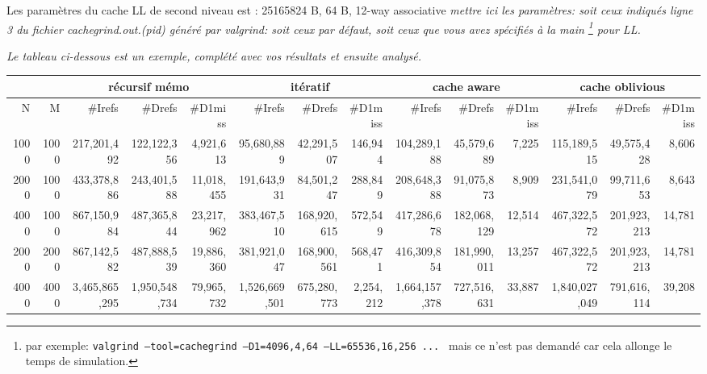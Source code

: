 \documentclass[10pt,a4paper]{article}
\begin{document}
Les paramètres du cache LL de second niveau est : 25165824 B, 64 B, 12-way associative
{\em mettre ici les paramètres: soit ceux indiqués ligne 3
du fichier cachegrind.out.(pid) généré par valgrind: soit ceux par défaut,
soit ceux que vous avez spécifiés à la main
\footnote{par exemple:
{\tt valgrind --tool=cachegrind --D1=4096,4,64 --LL=65536,16,256  ... }
mais ce n'est pas demandé car cela allonge le temps de simulation. } 
 pour LL. }

{\em Le tableau ci-dessous est un exemple,  complété avec vos résultats et 
ensuite analysé.}
\\

{\footnotesize
\begin{tabular}{|r|r||r|r|r||r|r|r||r|r|r||r|r|r||}
\hline
 \multicolumn{2}{|c||}{ } 
& \multicolumn{3}{c||}{récursif mémo}
& \multicolumn{3}{c||}{itératif}
& \multicolumn{3}{c||}{cache aware}
& \multicolumn{3}{c||}{cache oblivious}
\\ \hline
N & M 
& \#Irefs & \#Drefs & \#D1miss %
& \#Irefs & \#Drefs & \#D1miss %
& \#Irefs & \#Drefs & \#D1miss %
& \#Irefs & \#Drefs & \#D1miss %
\\ \hline
\hline
1000 & 1000 
& 217,201,492 & 122,122,356 & 4,921,613  %
& 95,680,889 & 42,291,507 &  146,944 %
& 104,289,188 & 45,579,689 & 7,225  %
& 115,189,515 & 49,575,428 &  8,606  %
\\ \hline
2000 & 1000 
& 433,378,886 & 243,401,588 & 11,018,455  %
& 191,643,931 & 84,501,247 & 288,849   %
& 208,648,388 & 91,075,873 &  8,909 %
& 231,541,079 & 99,711,653 & 8,643  %
\\ \hline
4000 & 1000 
&867,150,984 & 487,365,844 & 23,217,962  %
&383,467,510  & 168,920,615 & 572,549  %
& 417,286,678 & 182,068,129 & 12,514  %
& 467,322,572 & 201,923,213 &  14,781 %
\\ \hline
2000 & 2000 
& 867,142,582 & 487,888,539 &  19,886,360 %
& 381,921,047 & 168,900,561 & 568,471  %
& 416,309,854 & 181,990,011 & 13,257  %
& 467,322,572 & 201,923,213 &  14,781 %
\\ \hline
4000 & 4000 
& 3,465,865,295 & 1,950,548,734 & 79,965,732  %
& 1,526,669,501 & 675,280,773 & 2,254,212  %
& 1,664,157,378 & 727,516,631 &  33,887 %
& 1,840,027,049 & 791,616,114 &  39,208  %

\end{tabular}}
\end{document}
